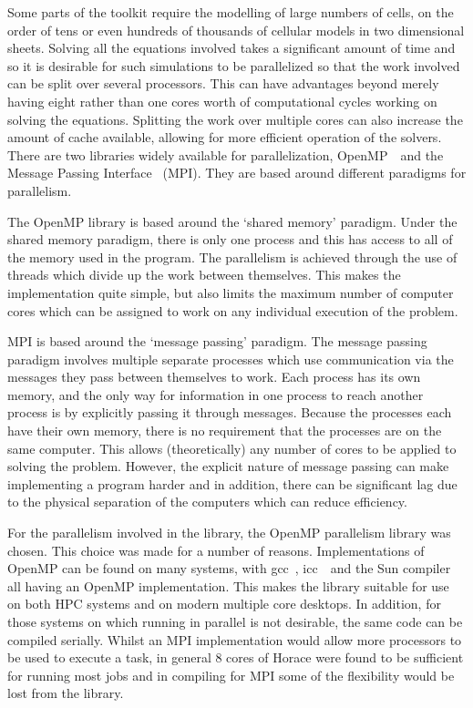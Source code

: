 Some parts of the toolkit require the modelling of large numbers of cells, on
the order of tens or even hundreds of thousands of cellular models in two
dimensional sheets.  Solving all the equations involved takes a significant
amount of time and so it is desirable for such simulations to be parallelized so
that the work involved can be split over several processors.  This can have
advantages beyond merely having eight rather than one cores worth of
computational cycles working on solving the equations.  Splitting the work over
multiple cores can also increase the amount of cache available, allowing for
more efficient operation of the solvers.
There are two libraries widely available for parallelization,
OpenMP~\cite{OpenMP}\ and the Message Passing Interface~\cite{MPI} (MPI).
They are based around different paradigms for parallelism.

The OpenMP library is based around the `shared memory' paradigm.
Under the shared memory paradigm, there is only one process and this has access
to all of the memory used in the program.
The parallelism is achieved through the use of threads which divide up the work
between themselves.
This makes the implementation quite simple, but also limits the maximum number
of computer cores which can be assigned to work on any individual execution of
the problem.

MPI is based around the `message passing' paradigm.
The message passing paradigm involves multiple separate processes which use
communication via the messages they pass between themselves to work.
Each process has its own memory, and the only way for information in one process
to reach another process is by explicitly passing it through messages.
Because the processes each have their own memory, there is no requirement that
the processes are on the same computer.
This allows (theoretically) any number of cores to be applied to solving the
problem.
However, the explicit nature of message passing can make implementing a program
harder and in addition, there can be significant lag due to the physical
separation of the computers which can reduce efficiency.

For the parallelism involved in the library, the OpenMP parallelism library was
chosen.
This choice was made for a number of reasons.
Implementations of OpenMP can be found on many systems, with gcc~\cite{gcc},
icc~\cite{icc}\ and the
Sun compiler all having an OpenMP implementation.
This makes the library suitable for use on both HPC systems and on modern
multiple core desktops.
In addition, for those systems on which running in parallel is not desirable,
the same code can be compiled serially.
Whilst an MPI implementation would allow more processors to be used to execute a
task, in general 8 cores of Horace were found to be sufficient for running most
jobs and in compiling for MPI some of the flexibility would be lost from the
library.

